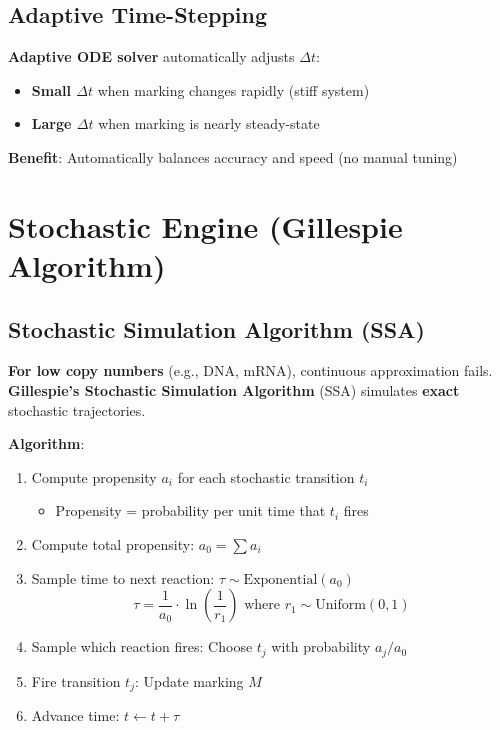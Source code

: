 \subsection{Adaptive Time-Stepping}
\label{subsec:adaptive-stepping}

\textbf{Adaptive ODE solver} automatically adjusts $\Delta t$:

\begin{itemize}
    \item \textbf{Small $\Delta t$} when marking changes rapidly (stiff system)
    \item \textbf{Large $\Delta t$} when marking is nearly steady-state
\end{itemize}

\textbf{Benefit}: Automatically balances accuracy and speed (no manual tuning)

\section{Stochastic Engine (Gillespie Algorithm)}
\label{sec:stochastic-engine}

\subsection{Stochastic Simulation Algorithm (SSA)}
\label{subsec:gillespie-ssa}

\textbf{For low copy numbers} (e.g., DNA, mRNA), continuous approximation fails. \textbf{Gillespie's Stochastic Simulation Algorithm} (SSA) simulates \textbf{exact} stochastic trajectories.

\textbf{Algorithm}:

\begin{enumerate}
    \item Compute propensity $a_i$ for each stochastic transition $t_i$
    \begin{itemize}
        \item Propensity = probability per unit time that $t_i$ fires
    \end{itemize}
    
    \item Compute total propensity: $a_0 = \sum a_i$
    
    \item Sample time to next reaction: $\tau \sim \text{Exponential}(a_0)$
    \begin{equation}
    \tau = \frac{1}{a_0} \cdot \ln\left(\frac{1}{r_1}\right) \text{ where } r_1 \sim \text{Uniform}(0,1)
    \end{equation}
    
    \item Sample which reaction fires: Choose $t_j$ with probability $a_j/a_0$
    
    \item Fire transition $t_j$: Update marking $M$
    
    \item Advance time: $t \leftarrow t + \tau$
\end{enumerate}

